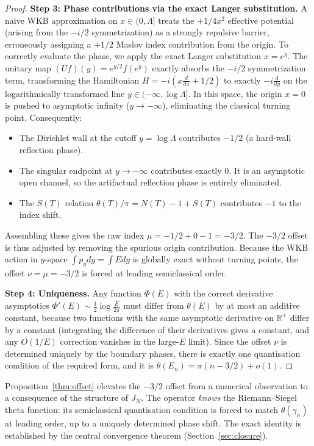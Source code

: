 \documentclass{pre-aomart}
\theoremstyle{plain}
\theoremstyle{definition}
\theoremstyle{remark}
\begin{document}
\begin{proof}
\textbf{Step 3: Phase contributions via the exact Langer substitution.}
A naive WKB approximation on $x \in (0, \Lambda]$ treats the $+1/4x^2$ effective potential (arising from the $-i/2$ symmetrization) as a strongly repulsive barrier, erroneously assigning a $+1/2$ Maslov index contribution from the origin.
To correctly evaluate the phase, we apply the exact Langer substitution $x = e^y$. The unitary map $(Uf)(y) = e^{y/2}f(e^y)$ exactly absorbs the $-i/2$ symmetrization term, transforming the Hamiltonian $H = -i(x\frac{d}{dx} + 1/2)$ to exactly $-i\frac{d}{dy}$ on the logarithmically transformed line $y \in (-\infty, \log \Lambda]$.
In this space, the origin $x=0$ is pushed to asymptotic infinity ($y \to -\infty$), eliminating the classical turning point. Consequently:
\begin{itemize}
\item The Dirichlet wall at the cutoff $y = \log \Lambda$ contributes $-1/2$ (a hard-wall reflection phase).
\item The singular endpoint at $y \to -\infty$ contributes exactly $0$. It is an asymptotic open channel, so the artifactual reflection phase is entirely eliminated.
\item The $S(T)$ relation $\theta(T)/\pi = N(T) - 1 + S(T)$ contributes $-1$ to the index shift.
\end{itemize}
Assembling these gives the raw index $\mu = -1/2 + 0 - 1 = -3/2$.
The $-3/2$ offset is thus adjusted by removing the spurious origin contribution. Because the WKB action in $y$-space $\int p_y dy = \int E dy$ is globally exact without turning points, the offset $\nu = \mu = -3/2$ is forced at leading semiclassical order.

\textbf{Step 4: Uniqueness.}
Any function $\Phi(E)$ with the correct derivative asymptotics
$\Phi'(E) \sim \frac{1}{2}\log\frac{E}{2\pi}$ must differ from $\theta(E)$
by at most an additive constant, because two functions with the same
asymptotic derivative on $\mathbb{R}^+$ differ by a constant (integrating
the difference of their derivatives gives a constant, and any $O(1/E)$
correction vanishes in the large-$E$ limit).  Since the offset $\nu$ is
determined uniquely by the boundary phases, there is exactly one
quantisation condition of the required form, and it is
$\theta(E_n) = \pi(n - 3/2) + o(1)$.
\end{proof}

Proposition~\ref{thm:offset} elevates the $-3/2$ offset from a numerical
observation to a consequence of the structure of $J_N$.  The operator
\emph{knows} the Riemann--Siegel theta function: its semiclassical
quantisation condition is forced to match $\theta(\gamma_n)$ at leading
order, up to a uniquely determined phase shift.  The exact identity
is established by the central convergence theorem
(Section~\ref{sec:closure}).
\end{document}
